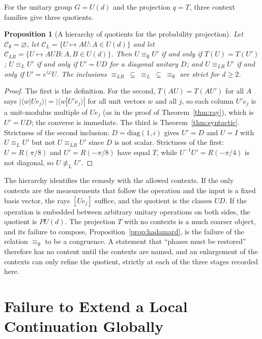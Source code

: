 \documentclass[11pt,oneside]{book}
\newtheorem{proposition}[theorem]{Proposition}
\theoremstyle{definition}
\theoremstyle{remark}
\begin{document}
For the unitary group $G=U(d)$ and the projection $q=T$, three context families give three quotients.

\begin{proposition}[A hierarchy of quotients for the probability projection]\label{prop:hierarchy}
Let $\mathcal C_\emptyset=\varnothing$, let $\mathcal C_L=\{U\mapsto AU:A\in U(d)\}$ and let $\mathcal C_{LR}=\{U\mapsto AUB:A,B\in U(d)\}$. Then $U\equiv_{\emptyset}U'$ if and only if $T(U)=T(U')$; $U\equiv_LU'$ if and only if $U'=UD$ for a diagonal unitary $D$; and $U\equiv_{LR}U'$ if and only if $U'=e^{i\varphi}U$. The inclusions $\equiv_{LR}\ \subsetneq\ \equiv_L\ \subsetneq\ \equiv_\emptyset$ are strict for $d\geq2$.
\end{proposition}

\begin{proof}
The first is the definition. For the second, $T(AU)=T(AU')$ for all $A$ says $|\langle w|Ue_j\rangle|=|\langle w|U'e_j\rangle|$ for all unit vectors $w$ and all $j$, so each column $U'e_j$ is a unit-modulus multiple of $Ue_j$ (as in the proof of Theorem~\ref{thm:ray}), which is $U'=UD$; the converse is immediate. The third is Theorem~\ref{thm:syntactic}. Strictness of the second inclusion: $D=\mathrm{diag}(1,i)$ gives $U'=D$ and $U=I$ with $U\equiv_LU'$ but not $U\equiv_{LR}U'$ since $D$ is not scalar. Strictness of the first: $U=R(\pi/8)$ and $U'=R(-\pi/8)$ have equal $T$, while $U^{-1}U'=R(-\pi/4)$ is not diagonal, so $U\not\equiv_LU'$.
\end{proof}

The hierarchy identifies the remedy with the allowed contexts. If the only contexts are the measurements that follow the operation and the input is a fixed basis vector, the rays $[Ue_j]$ suffice, and the quotient is the classes $UD$. If the operation is embedded between arbitrary unitary operations on both sides, the quotient is $PU(d)$. The projection $T$ with no contexts is a much coarser object, and its failure to compose, Proposition~\ref{prop:hadamard}, is the failure of the relation $\equiv_\emptyset$ to be a congruence. A statement that ``phases must be restored'' therefore has no content until the contexts are named, and an enlargement of the contexts can only refine the quotient, strictly at each of the three stages recorded here.

\chapter{Failure to Extend a Local Continuation Globally}\label{ch:extend-fail}
\end{document}

